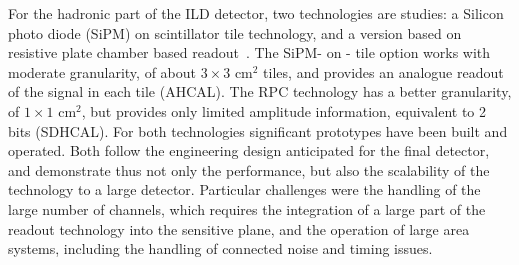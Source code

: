 \documentclass[%
 amsmath,amssymb,
 aps,
]{revtex4-1}
\begin{document}
For the hadronic part of the ILD detector, two technologies are studies: a Silicon photo diode (SiPM) on scintillator tile technology\cite{Simon:2010mi}, and a version based on resistive plate chamber based readout~\cite{Laktineh:2010zsa}. The SiPM- on - tile option works with moderate granularity, of about $3 \times 3$ cm$^2$ tiles, and provides an analogue readout of the signal in each tile (AHCAL). The RPC technology has a better granularity, of $1 \times 1$ cm$^2$, but provides only limited amplitude information, equivalent to 2 bits (SDHCAL). For both technologies significant prototypes have been built and operated. Both follow the engineering design anticipated for the final detector, and demonstrate thus not only the performance, but also the scalability of the technology to a large detector. Particular challenges were the handling of the large number of channels, which requires the integration of a large part of the readout technology into the sensitive plane, and the operation of large area systems, including the handling of connected noise and timing issues. 
\end{document}
